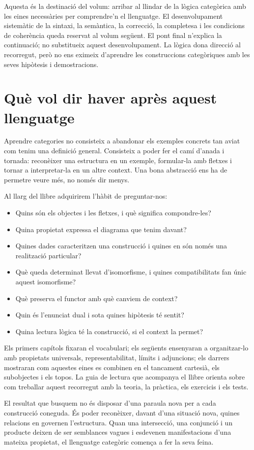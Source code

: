 Aquesta és la destinació del volum: arribar al llindar de la lògica
categòrica amb les eines necessàries per comprendre'n el llenguatge.
El desenvolupament sistemàtic de la sintaxi, la semàntica, la correcció,
la completesa i les condicions de coherència queda reservat al volum
següent. El pont final n'explica la continuació; no substitueix aquest
desenvolupament. La lògica dona direcció al recorregut, però no ens
eximeix d'aprendre les construccions categòriques amb les seves
hipòtesis i demostracions.

\section{Què vol dir haver après aquest llenguatge}

Aprendre categories no consisteix a abandonar els exemples concrets
tan aviat com tenim una definició general. Consisteix a poder fer el
camí d'anada i tornada: reconèixer una estructura en un exemple,
formular-la amb fletxes i tornar a interpretar-la en un altre context.
Una bona abstracció ens ha de permetre veure més, no només dir menys.

Al llarg del llibre adquirirem l'hàbit de preguntar-nos:
\begin{itemize}
  \item Quins són els objectes i les fletxes, i què significa compondre-les?
  \item Quina propietat expressa el diagrama que tenim davant?
  \item Quines dades caracteritzen una construcció i quines en són
        només una realització particular?
  \item Què queda determinat llevat d'isomorfisme, i quines
        compatibilitats fan únic aquest isomorfisme?
  \item Què preserva el functor amb què canviem de context?
  \item Quin és l'enunciat dual i sota quines hipòtesis té sentit?
  \item Quina lectura lògica té la construcció, si el context la permet?
\end{itemize}

Els primers capítols fixaran el vocabulari; els següents ensenyaran
a organitzar-lo amb propietats universals, representabilitat, límits
i adjuncions; els darrers mostraran com aquestes eines es combinen
en el tancament cartesià, els subobjectes i els topos. La guia de
lectura que acompanya el llibre orienta sobre com treballar aquest
recorregut amb la teoria, la pràctica, els exercicis i els tests.

El resultat que busquem no és disposar d'una paraula nova per a cada
construcció coneguda. És poder reconèixer, davant d'una situació nova,
quines relacions en governen l'estructura. Quan una intersecció, una
conjunció i un producte deixen de ser semblances vagues i esdevenen
manifestacions d'una mateixa propietat, el llenguatge categòric
comença a fer la seva feina.

\endgroup
